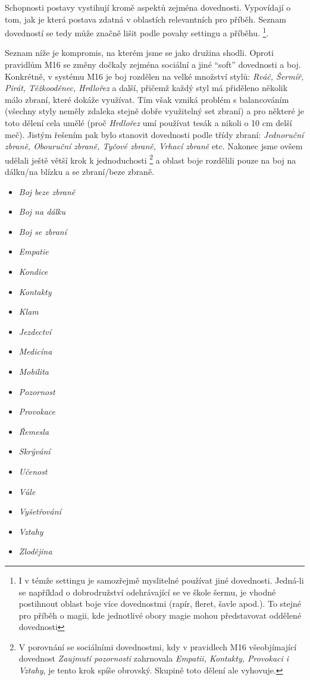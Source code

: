 \documentclass[../main.tex]{subfiles}
\begin{document}
Schopnosti postavy vystihují kromě aspektů zejména dovednosti. Vypovídají o tom, jak je která postava zdatná v oblastích relevantních pro příběh. Seznam dovedností se tedy může značně lišit podle povahy settingu a příběhu. \footnote{I v témže settingu je samozřejmě myslitelné používat jiné dovednosti. Jedná-li se například o dobrodružství odehrávající se ve škole šermu, je vhodné postihnout oblast boje více dovednostmi (rapír, fleret, šavle apod.). To stejné pro příběh o magii, kde jednotlivé obory magie mohou představovat oddělené dovednosti}.

Seznam níže je kompromis, na kterém jsme se jako družina shodli. Oproti pravidlům M16 se změny dočkaly zejména sociální a jiné ``soft'' dovednosti a boj. Konkrétně, v systému M16 je boj rozdělen na velké množství stylů: \textit{Rváč, Šermíř, Pirát, Těžkooděnec, Hrdlořez} a další, přičemž každý styl má přiděleno několik málo zbraní, které dokáže využívat. Tím však vzniká problém s balancováním (všechny styly neměly zdaleka stejně dobře využitelný set zbraní) a pro některé je toto dělení cela umělé (proč \textit{Hrdlořez} umí používat tesák a nikoli o 10 cm delší meč). Jistým řešením pak bylo stanovit dovednosti podle třídy zbraní: \textit{Jednoruční zbraně, Obouruční zbraně, Tyčové zbraně, Vrhací zbraně} etc. Nakonec jsme ovšem udělali ještě větší krok k jednoduchosti \footnote{V porovnání se sociálními dovednostmi, kdy v pravidlech M16 všeobjímající dovednost \textit{Zaujmutí pozornosti} zahrnovala \textit{Empatii, Kontakty, Provokaci i Vztahy}, je tento krok spíše obrovský. Skupině toto dělení ale vyhovuje.} a oblast boje rozdělili pouze na boj na dálku/na blízku a se zbraní/beze zbraně.

\begin{itemize}

\item \textit{Boj beze zbraně}
\item \textit{Boj na dálku}
\item \textit{Boj se zbraní}
\item \textit{Empatie}
\item \textit{Kondice}
\item \textit{Kontakty}
\item \textit{Klam}
\item \textit{Jezdectví}
\item \textit{Medicína}
\item \textit{Mobilita}
\item \textit{Pozornost}
\item \textit{Provokace}
\item \textit{Řemesla}
\item \textit{Skrývání}
\item \textit{Učenost}
\item \textit{Vůle}
\item \textit{Vyšetřování}
\item \textit{Vztahy}
\item \textit{Zlodějina}
\end{itemize}
\end{document}
